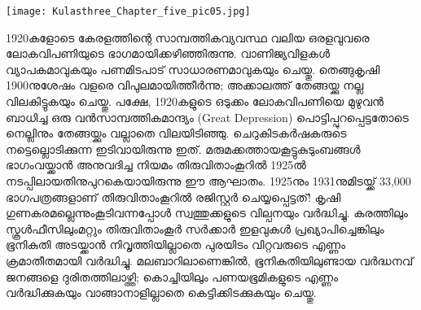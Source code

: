 \label{ch5box5} %
\begin{tcolorbox}[%
 breakable, %
  arc=0mm, 
  left=1pt, right = 1pt, 
  boxrule=0mm,
  colback = {blue!10}, %
] 

\begin{center}
\texttt{[image: Kulasthree\_Chapter\_five\_pic05.jpg]}
\end{center}


1920കളോടെ കേരളത്തിന്റെ സാമ്പത്തികവ്യവസ്ഥ വലിയ ഒരളവുവരെ ലോകവിപണിയുടെ ഭാഗമായിക്കഴിഞ്ഞിരുന്നു. വാണിജ്യവിളകൾ വ്യാപകമാവുകയും പണമിടപാട് സാധാരണമാവുകയും ചെയ്തു. തെങ്ങുകൃഷി 1900നുശേഷം വളരെ വിപുലമായിത്തീർന്നു; അക്കാലത്ത് തേങ്ങയ്ക്കു നല്ല വിലകിട്ടുകയും ചെയ്തു. പക്ഷേ, 1920കളുടെ ഒടുക്കം ലോകവിപണിയെ മുഴുവൻ ബാധിച്ച ഒരു വൻസാമ്പത്തികമാന്ദ്യം (Great Depression) പൊട്ടിപ്പുറപ്പെട്ടതോടെ നെല്ലിനും തേങ്ങയ്ക്കും വല്ലാതെ വിലയിടിഞ്ഞു. ചെറുകിടകർഷകരുടെ നട്ടെല്ലൊടിക്കുന്ന ഇടിവായിരുന്നു ഇത്. മരുമക്കത്തായകൂട്ടുകുടുംബങ്ങൾ ഭാഗംവയ്ക്കാൻ അനുവദിച്ച നിയമം തിരുവിതാംകൂറിൽ 1925ൽ നടപ്പിലായതിനുപുറകെയായിരുന്നു ഈ ആഘാതം. 1925നും 1931നുമിടയ്ക്ക് 33,000 ഭാഗപത്രങ്ങളാണ് തിരുവിതാംകൂറിൽ രജിസ്റ്റർ ചെയ്യപ്പെട്ടത്! കൃഷി ഗുണകരമല്ലെന്നുംകൂടിവന്നപ്പോൾ സ്വത്തുക്കളുടെ വില്പനയും വർദ്ധിച്ചു. കരത്തിലും സ്കൂൾഫീസിലുംമറ്റും തിരുവിതാംകൂർ സർക്കാർ ഇളവുകൾ പ്രഖ്യാപിച്ചെങ്കിലും ഭൂനികുതി അടയ്ക്കാൻ നിവൃത്തിയില്ലാതെ പുരയിടം വിറ്റവരുടെ എണ്ണം ക്രമാതീതമായി വർദ്ധിച്ചു. മലബാറിലാണെങ്കിൽ, ഭൂനികുതിയിലുണ്ടായ വർദ്ധനവ് ജനങ്ങളെ ദുരിതത്തിലാഴ്ത്തി; കൊച്ചിയിലും പണയഭൂമികളുടെ എണ്ണം വർദ്ധിക്കുകയും വാങ്ങാനാളില്ലാതെ കെട്ടിക്കിടക്കുകയും ചെയ്തു.
\end{tcolorbox}
 
